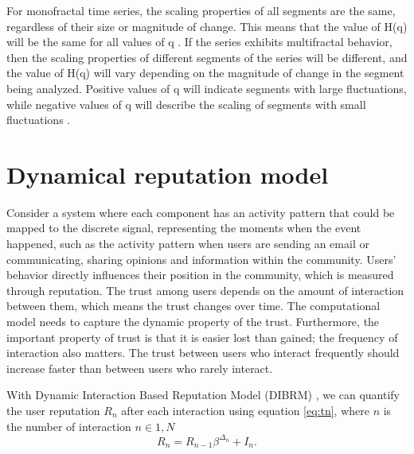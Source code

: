 For monofractal time series, the scaling properties of all segments are the same, regardless of their size or magnitude of change. This means that the value of H(q) will be the same for all values of q \cite{kantelhardt2002, kantelhardt2008fractal}. If the series exhibits multifractal behavior, then the scaling properties of different segments of the series will be different, and the value of H(q) will vary depending on the magnitude of change in the segment being analyzed. Positive values of q will indicate segments with large fluctuations, while negative values of q will describe the scaling of segments with small fluctuations \cite{kantelhardt2008fractal}.



\section{Dynamical reputation model} \label{sec:met_dibrm}

Consider a system where each component has an activity pattern that could be mapped to the discrete signal, representing the moments when the event happened, such as the activity pattern when users are sending an email or communicating, sharing opinions and information within the community. Users' behavior directly influences their position in the community, which is measured through reputation. The trust among users depends on the amount of interaction between them, which means the trust changes over time. The computational model needs to capture the dynamic property of the trust. Furthermore, the important property of trust is that it is easier lost than gained; the frequency of interaction also matters. The trust between users who interact frequently should increase faster than between users who rarely interact. 

With Dynamic Interaction Based Reputation Model (DIBRM) \cite{melnikov2018toward}, we can quantify the user reputation $R_n$ after each interaction using equation \ref{eq:tn}, where $n$ is the number of interaction $n\in{1, N}$
\begin{equation}\label{eq:tn}
R_{n}=R_{n-1} \beta^{\Delta_{n}} + I_{n}.
\end{equation}

